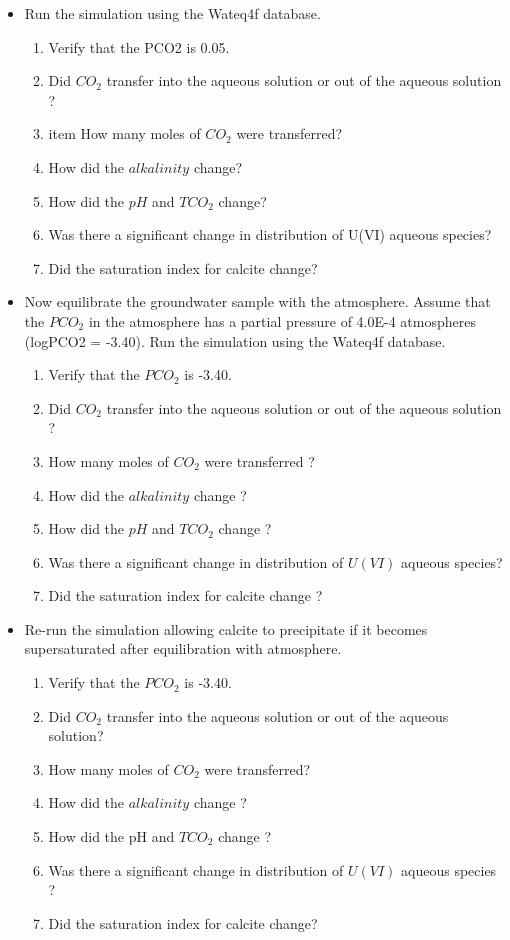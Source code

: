 \begin{itemize}
\item Run the simulation using the Wateq4f database.
\begin{enumerate}
\item Verify that the PCO2 is 0.05.
\item Did $CO_2$ transfer into the aqueous solution or out of the aqueous solution ?
\item item How many moles of $CO_2$ were transferred?
\item How did the $alkalinity$ change?
\item How did the $pH$ and $TCO_2$ change?
\item Was there a significant change in distribution of U(VI) aqueous species?
\item Did the saturation index for calcite change?
\end{enumerate}
\item Now equilibrate the groundwater sample with the atmosphere. Assume that the $PCO_2$ in the atmosphere has a partial pressure of 4.0E-4 atmospheres (logPCO2 = -3.40). Run the simulation using the Wateq4f database.
\begin{enumerate}
\item Verify that the $PCO_2$ is -3.40.
\item Did $CO_2$ transfer into the aqueous solution or out of the aqueous solution ?
\item How many moles of $CO_2$ were transferred ?
\item How did the $alkalinity$ change ?
\item How did the $pH$ and $TCO_2$ change ?
\item Was there a significant change in distribution of $U(VI)$ aqueous species?
\item	Did the saturation index for calcite change ?
\end{enumerate}
\item Re-run the simulation allowing calcite to precipitate if it becomes supersaturated after equilibration with atmosphere.
\begin{enumerate}
\item Verify that the $PCO_2$ is -3.40.
\item Did $CO_2$ transfer into the aqueous solution or out of the aqueous solution?
\item How many moles of $CO_2$ were transferred?
\item How did the $alkalinity$ change ?
\item How did the pH and $TCO_2$ change ?
\item Was there a significant change in distribution of $U(VI)$ aqueous species ?
\item Did the saturation index for calcite change?
\end{enumerate}
\end{itemize}